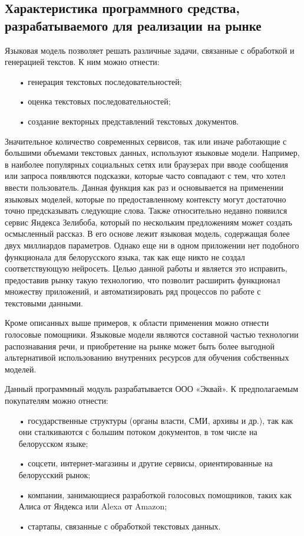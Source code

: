 
\subsection{Характеристика программного средства, разрабатываемого для реализации на рынке}
Языковая модель позволяет решать различные задачи, связанные с обработкой и генерацией текстов. К ним можно отнести:
\begin{itemize}
	\item[•] генерация текстовых последовательностей;
	\item[•] оценка текстовых последовательностей;
	\item[•] создание векторных представлений текстовых документов.
\end{itemize}

Значительное количество современных сервисов, так или иначе работающие с большими объемами текстовых данных, используют языковые модели. Например, в наиболее популярных социальных сетях или браузерах при вводе сообщения или запроса появляются подсказки, которые часто совпадают с тем, что хотел ввести пользователь. Данная функция как раз и основывается на применении языковых моделей, которые по предоставленному контексту могут достаточно точно предсказывать следующие слова.
Также относительно недавно появился сервис Яндекса Зелибоба, который по нескольким предложениям может создать осмысленный рассказ. В его основе лежит языковая модель, содержащая более двух миллиардов параметров. Однако еще ни в одном приложении нет подобного функционала для белорусского языка, так как еще никто не создал соответствующую нейросеть. Целью данной работы и является это исправить, предоставив рынку такую технологию, что позволит расширить функционал множеству приложений, и автоматизировать ряд процессов по работе с текстовыми данными.

Кроме описанных выше примеров, к области применения можно отнести голосовые помощники. Языковые модели являются составной частью технологии распознавания речи, и приобретение на рынке может быть более выгодной альтернативой использованию внутренних ресурсов для обучения собственных моделей.

Данный программный модуль разрабатывается ООО «Эквай». К предполагаемым покупателям можно отнести:
\begin{itemize}
	\item[•] государственные структуры (органы власти, СМИ, архивы и др.), так как они сталкиваются с большим потоком документов, в том числе на белорусском языке;
	\item[•] соцсети, интернет-магазины и другие сервисы, ориентированные на белорусский рынок;
	\item[•] компании, занимающиеся разработкой голосовых помощников, таких как Алиса от Яндекса или Alexa от Amazon;
	\item[•] стартапы, связанные с обработкой текстовых данных.
\end{itemize}

